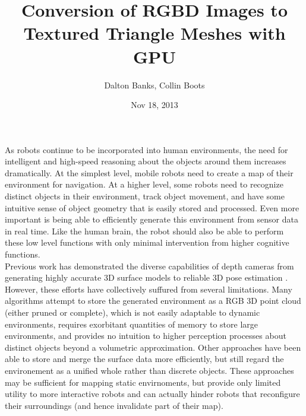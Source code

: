 \documentclass[letterpaper, 10 pt, conference]{ieeeconf}
\title{Conversion of RGBD Images to Textured Triangle Meshes with GPU}
\author{Dalton Banks, Collin Boots}
\date{Nov 18, 2013}
\begin{document}
   \maketitle

As robots continue to be incorporated into human environments, the need for intelligent and high-speed reasoning about the objects around them increases dramatically. At the simplest level, mobile robots need to create a map of their environment for navigation. At a higher level, some robots need to recognize distinct objects in their environment, track object movement, and have some intuitive sense of object geometry that is easily stored and processed. Even more important is being able to efficiently generate this environment from sensor data in real time. Like the human brain, the robot should also be able to perform these low level functions with only minimal intervention from higher cognitive functions.\\

Previous work has demonstrated the diverse capabilities of depth cameras from generating highly accurate 3D surface models \cite{KinectFusion} to reliable 3D pose estimation \cite{Endres,Taguchi}. However, these efforts have collectively suffured from several limitations. Many algorithms attempt to store the generated environment as a RGB 3D point cloud (either pruned or complete), which is not easily adaptable to dynamic environments, requires exorbitant quantities of memory to store large environments, and provides no intuition to higher perception processes about distinct objects beyond a volumetric approximation. Other approaches have been able to store and merge the surface data more efficiently, but still regard the environement as a unified whole rather than discrete objects. These approaches may be sufficient for mapping static envirnoments, but provide only limited utility to more interactive robots and can actually hinder robots that reconfigure their surroundings (and hence invalidate part of their map).
\end{document}

